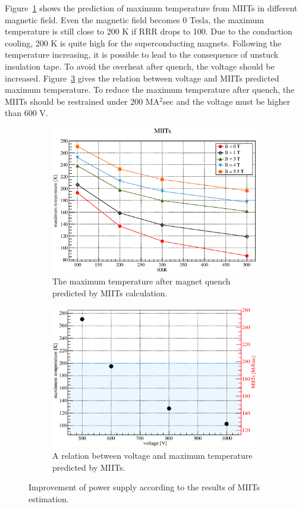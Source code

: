 Figure~\ref{4rrrmiits} shows the prediction of maximum temperature from MIITs in different magnetic field.
Even the magnetic field becomes 0 Tesla, the maximum temperature is still close to 200 K if RRR drops to 100.
Due to the conduction cooling, 200 K is quite high for the superconducting magnets.
Following the temperature increasing, it is possible to lead to the consequence of unstuck insulation tape.
To avoid the overheat after quench, the voltage should be increased.
Figure~\ref{4miitsv} gives the relation between voltage and MIITs predicted maximum temperature.
To reduce the maximum temperature after quench, the MIITs should be restrained under 200 MA$^2$sec and the voltage must be higher than 600 V.
  \begin{figure}[H]
   \begin{subfigure}{3.1in}
    \centering
    \includegraphics[scale=0.43]{chapter5/fig/RRRvsMIITs.eps}
    \caption{The maximum temperature after magnet quench predicted by MIITs calculation.}
    \label{4rrrmiits}
   \end{subfigure}
   \quad
   \begin{subfigure}{3.1in}
    \centering
    \includegraphics[scale=0.43]{chapter5/fig/miitsvoltage.eps}
    \caption{A relation between voltage and maximum temperature predicted by MIITs.}
    \label{4miitsv}
   \end{subfigure}
   \caption{Improvement of power supply according to the results of MIITs estimation.}
  \end{figure}
